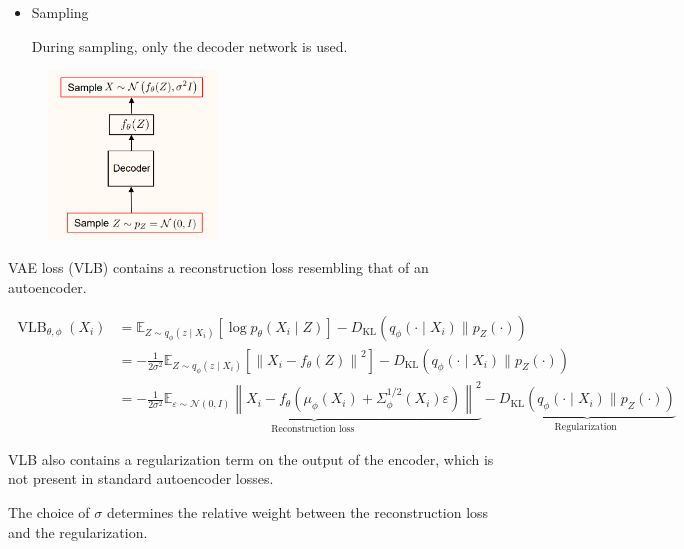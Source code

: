 \begin{concept}
    \par\noindent\textcolor{gray}{\hdashrule{\textwidth}{0.4pt}{1pt 2pt}}

    \begin{itemize}
        \item
        Sampling

        During sampling, only the decoder network is used.
    \end{itemize}

    \begin{figure}[H]
        \centering
        \includegraphics[width=0.4\textwidth]{.././assets/11.7.png}
    \end{figure}
\end{concept}

\begin{concept}
    VAE loss (VLB) contains a reconstruction loss resembling that of an autoencoder.

    $$
    \begin{aligned}
    \operatorname{VLB}_{\theta, \phi}\left(X_{i}\right) & =\mathbb{E}_{Z \sim q_{\phi}\left(z \mid X_{i}\right)}\left[\log p_{\theta}\left(X_{i} \mid Z\right)\right]-D_{\mathrm{KL}}\left(q_{\phi}\left(\cdot \mid X_{i}\right) \| p_{Z}(\cdot)\right) \\
    & =-\frac{1}{2 \sigma^{2}} \mathbb{E}_{Z \sim q_{\phi}\left(z \mid X_{i}\right)}\left[\left\|X_{i}-f_{\theta}(Z)\right\|^{2}\right]-D_{\mathrm{KL}}\left(q_{\phi}\left(\cdot \mid X_{i}\right) \| p_{Z}(\cdot)\right) \\
    & =-\underbrace{\frac{1}{2 \sigma^{2}} \mathbb{E}_{\varepsilon \sim \mathcal{N}(0, I)}\left\|X_{i}-f_{\theta}\left(\mu_{\phi}\left(X_{i}\right)+\Sigma_{\phi}^{1 / 2}\left(X_{i}\right) \varepsilon\right)\right\|^{2}}_{\text {Reconstruction loss }}-\underbrace{D_{\mathrm{KL}}\left(q_{\phi}\left(\cdot \mid X_{i}\right) \| p_{Z}(\cdot)\right)}_{\text {Regularization }}
    \end{aligned}
    $$

    VLB also contains a regularization term on the output of the encoder, which is not present in standard autoencoder losses.

    The choice of $\sigma$ determines the relative weight between the reconstruction loss and the regularization.
\end{concept}

